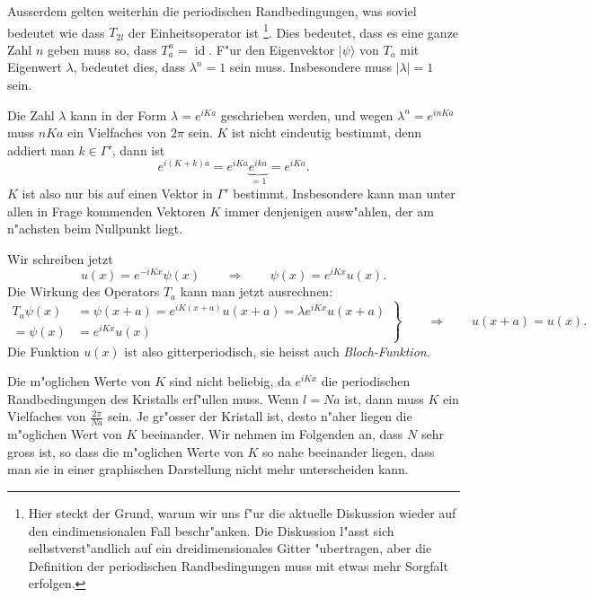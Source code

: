 Ausserdem gelten weiterhin die periodischen Randbedingungen,
was soviel bedeutet wie dass $T_{2l}$ der Einheitsoperator ist%
\footnote{Hier
steckt der Grund, warum wir uns f"ur die aktuelle Diskussion wieder
auf den eindimensionalen Fall beschr"anken. Die Diskussion l"asst sich
selbstverst"andlich auf ein dreidimensionales Gitter "ubertragen, aber
die Definition der periodischen Randbedingungen muss mit etwas mehr
Sorgfalt erfolgen.}.
Dies bedeutet, dass es eine ganze Zahl $n$ geben muss so,
dass $T_a^n=\operatorname{id}$. F"ur den Eigenvektor $|\psi\rangle$
von $T_a$ mit Eigenwert $\lambda$, bedeutet dies, dass $\lambda^n=1$
sein muss. Insbesondere muss $|\lambda|=1$ sein. 

Die Zahl $\lambda$ kann in der Form $\lambda=e^{iKa}$ geschrieben werden,
und wegen $\lambda^n=e^{inKa}$ muss $nKa$ ein Vielfaches von $2\pi$ sein.
$K$ ist nicht eindeutig bestimmt, denn addiert man $k\in\Gamma'$, dann ist
\[
e^{i(K+k)a}=e^{iKa}\underbrace{e^{ika}}_{=1}=e^{iKa}.
\]
$K$ ist also nur bis auf einen Vektor in $\Gamma'$ bestimmt.
Insbesondere kann man unter allen in Frage kommenden Vektoren $K$ immer
denjenigen ausw"ahlen, der am n"achsten beim Nullpunkt liegt.

Wir schreiben jetzt
\[
u(x)=e^{-iKx}\psi(x)
\qquad\Rightarrow\qquad
\psi(x)=e^{iKx}u(x).
\]
Die Wirkung des Operators $T_a$ kann man jetzt ausrechnen:
\begin{equation}
\left.
\begin{aligned}
T_a\psi(x)&=\psi(x+a)=e^{iK(x+a)}u(x+a)=\lambda e^{iKx}u(x+a)
\\
=\psi(x)&=e^{iKx}u(x)
\end{aligned}
\right\}
\qquad\Rightarrow\qquad
u(x+a)=u(x).
\end{equation}
Die Funktion $u(x)$ ist also gitterperiodisch, sie heisst auch
{\em Bloch-Funktion}.
%

Die m"oglichen Werte von $K$ sind nicht beliebig, da $e^{iKx}$ die
periodischen Randbedingungen des Kristalls erf"ullen muss. Wenn $l=Na$
ist, dann muss $K$ ein Vielfaches von $\frac{2\pi}{Na}$ sein.
Je gr"osser der Kristall ist, desto n"aher liegen die m"oglichen
Wert von $K$ beeinander.
Wir nehmen im Folgenden an, dass $N$ sehr gross ist, so dass die
m"oglichen Werte von $K$ so nahe beeinander liegen, dass man sie in
einer graphischen Darstellung nicht mehr unterscheiden kann.

